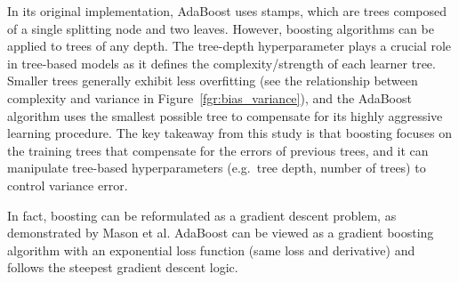 \documentclass[main]{subfiles}
\begin{document}
In its original implementation, AdaBoost uses stamps, which are trees composed of a single splitting node and two leaves. However, boosting algorithms can be applied to trees of any depth. The tree-depth hyperparameter plays a crucial role in tree-based models as it defines the complexity/strength of each learner tree. Smaller trees generally exhibit less overfitting (see the relationship between complexity and variance in Figure~\ref{fgr:bias_variance}), and the AdaBoost algorithm uses the smallest possible tree to compensate for its highly aggressive learning procedure. The key takeaway from this study is that boosting focuses on the training trees that compensate for the errors of previous trees, and it can manipulate tree-based hyperparameters (e.g.\ tree depth, number of trees) to control variance error.

In fact, boosting can be reformulated as a gradient descent problem, as demonstrated by Mason et al.\autocite{mason1999boosting} AdaBoost can be viewed as a gradient boosting algorithm with an exponential loss function (same loss and derivative) and follows the steepest gradient descent logic.\autocite{mason1999boosting,azencott2022introduction} 
\end{document}
